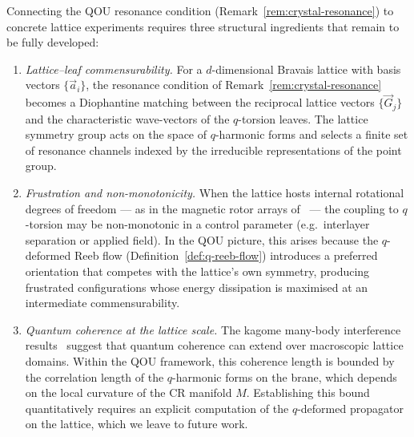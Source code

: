 \begin{remark}
\label{rem:lattice-layout}
Connecting the QOU resonance condition (Remark~\ref{rem:crystal-resonance}) to
concrete lattice experiments requires three structural ingredients that remain
to be fully developed:
\begin{enumerate}
  \item \emph{Lattice--leaf commensurability.}  For a $d$-dimensional
        Bravais lattice with basis vectors $\{\vec{a}_i\}$, the resonance
        condition of Remark~\ref{rem:crystal-resonance} becomes a Diophantine
        matching between the reciprocal lattice vectors
        $\{\vec{G}_j\}$ and the characteristic wave-vectors of the
        $q$-torsion leaves.  The lattice symmetry group acts on the space of
        $q$-harmonic forms and selects a finite set of resonance channels
        indexed by the irreducible representations of the point group.
  \item \emph{Frustration and non-monotonicity.}  When the lattice hosts
        internal rotational degrees of freedom --- as in the magnetic rotor
        arrays of~\cite{gu2026} --- the coupling to $q$-torsion may be
        non-monotonic in a control parameter (e.g.\ interlayer separation or
        applied field).  In the QOU picture, this arises because the
        $q$-deformed Reeb flow (Definition~\ref{def:q-reeb-flow}) introduces
        a preferred orientation that competes with the lattice's own symmetry,
        producing frustrated configurations whose energy dissipation is
        maximised at an intermediate commensurability.
  \item \emph{Quantum coherence at the lattice scale.}  The kagome
        many-body interference results~\cite{guo2025} suggest that quantum
        coherence can extend over macroscopic lattice domains.  Within the QOU
        framework, this coherence length is bounded by the correlation length
        of the $q$-harmonic forms on the brane, which depends on the local
        curvature of the CR manifold $M$.  Establishing this bound
        quantitatively requires an explicit computation of the $q$-deformed
        propagator on the lattice, which we leave to future work.
\end{enumerate}
\end{remark}

